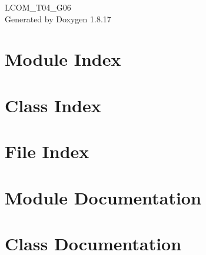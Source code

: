 \let\mypdfximage\pdfximage\def\pdfximage{\immediate\mypdfximage}\documentclass[twoside]{book}
\newcommand{\+}{\discretionary{\mbox{\scriptsize$\hookleftarrow$}}{}{}}
\newcommand{\clearemptydoublepage}{%
  \newpage{\pagestyle{empty}\cleardoublepage}%
}
\begin{document}
\hypersetup{pageanchor=false,
             bookmarksnumbered=true,
             pdfencoding=unicode
            }
\begin{titlepage}
\vspace*{7cm}
\begin{center}%
{\Large L\+C\+O\+M\+\_\+\+T04\+\_\+\+G06 }\\
\vspace*{1cm}
{\large Generated by Doxygen 1.8.17}\\
\end{center}
\end{titlepage}
\clearemptydoublepage
{}
\tableofcontents
\clearemptydoublepage
{}
\hypersetup{pageanchor=true}

\chapter{Module Index}

\chapter{Class Index}

\chapter{File Index}

\chapter{Module Documentation}










\chapter{Class Documentation}





\end{document}
